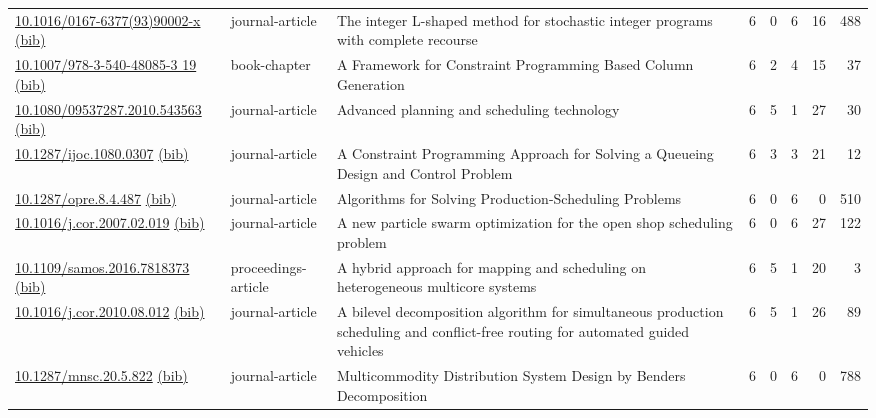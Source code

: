 {\begin{longtable}{p{5cm}lp{11cm}rrrrr}
\href{http://dx.doi.org/10.1016/0167-6377(93)90002-x}{10.1016/0167-6377(93)90002-x} \href{https://www.doi2bib.org/bib/10.1016/0167-6377(93)90002-x}{(bib)} & journal-article & The integer L-shaped method for stochastic integer programs with complete recourse & 6 & 0 & 6 & 16 & 488 \\
\href{http://dx.doi.org/10.1007/978-3-540-48085-3_19}{10.1007/978-3-540-48085-3 19} \href{https://www.doi2bib.org/bib/10.1007/978-3-540-48085-3_19}{(bib)} & book-chapter & A Framework for Constraint Programming Based Column Generation & 6 & 2 & 4 & 15 & 37 \\
\href{http://dx.doi.org/10.1080/09537287.2010.543563}{10.1080/09537287.2010.543563} \href{https://www.doi2bib.org/bib/10.1080/09537287.2010.543563}{(bib)} & journal-article & Advanced planning and scheduling technology & 6 & 5 & 1 & 27 & 30 \\
\href{http://dx.doi.org/10.1287/ijoc.1080.0307}{10.1287/ijoc.1080.0307} \href{https://www.doi2bib.org/bib/10.1287/ijoc.1080.0307}{(bib)} & journal-article & A Constraint Programming Approach for Solving a Queueing Design and Control Problem & 6 & 3 & 3 & 21 & 12 \\
\href{http://dx.doi.org/10.1287/opre.8.4.487}{10.1287/opre.8.4.487} \href{https://www.doi2bib.org/bib/10.1287/opre.8.4.487}{(bib)} & journal-article & Algorithms for Solving Production-Scheduling Problems & 6 & 0 & 6 & 0 & 510 \\
\href{http://dx.doi.org/10.1016/j.cor.2007.02.019}{10.1016/j.cor.2007.02.019} \href{https://www.doi2bib.org/bib/10.1016/j.cor.2007.02.019}{(bib)} & journal-article & A new particle swarm optimization for the open shop scheduling problem & 6 & 0 & 6 & 27 & 122 \\
\href{http://dx.doi.org/10.1109/samos.2016.7818373}{10.1109/samos.2016.7818373} \href{https://www.doi2bib.org/bib/10.1109/samos.2016.7818373}{(bib)} & proceedings-article & A hybrid approach for mapping and scheduling on heterogeneous multicore systems & 6 & 5 & 1 & 20 & 3 \\
\href{http://dx.doi.org/10.1016/j.cor.2010.08.012}{10.1016/j.cor.2010.08.012} \href{https://www.doi2bib.org/bib/10.1016/j.cor.2010.08.012}{(bib)} & journal-article & A bilevel decomposition algorithm for simultaneous production scheduling and conflict-free routing for automated guided vehicles & 6 & 5 & 1 & 26 & 89 \\
\href{http://dx.doi.org/10.1287/mnsc.20.5.822}{10.1287/mnsc.20.5.822} \href{https://www.doi2bib.org/bib/10.1287/mnsc.20.5.822}{(bib)} & journal-article & Multicommodity Distribution System Design by Benders Decomposition & 6 & 0 & 6 & 0 & 788 \\

\end{longtable}}
